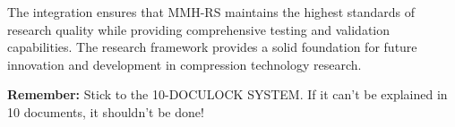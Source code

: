\documentclass[12pt,a4paper]{article}
\begin{document}
The integration ensures that MMH-RS maintains the highest standards of research quality while providing comprehensive testing and validation capabilities. The research framework provides a solid foundation for future innovation and development in compression technology research.

\textbf{Remember:} Stick to the 10-DOCULOCK SYSTEM. If it can't be explained in 10 documents, it shouldn't be done!
\end{document}
